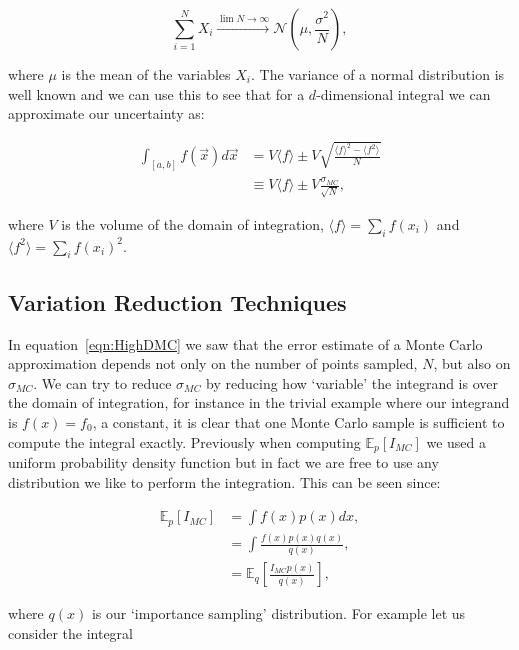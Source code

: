 	\begin{equation}
		\sum_{i=1}^{N}X_i\xrightarrow{\lim{N\rightarrow\infty}}\mathcal{N}\left(\mu, \frac{\sigma^2}{N}\right),
	\end{equation}

	\noindent where $\mu$ is the mean of the variables $X_i$.  The variance of a normal distribution is well known and we can use this to see that
	for a $d$-dimensional integral we can approximate our uncertainty as:

	\begin{align}
		\int_{[a, b]}f(\vec{x})d\vec{x} &= V\langle f\rangle \pm V\sqrt{\frac{\langle f\rangle^2 - \langle f^2\rangle}{N}}\\
		                                &\equiv V\langle f\rangle \pm V\frac{\sigma_{MC}}{\sqrt{N}},
		\label{eqn:HighDMC}
	\end{align}

	\noindent where $V$ is the volume of the domain of integration, $\langle f\rangle=\sum_i f(x_i)$ and $\langle f^2\rangle=\sum_i f(x_i)^2$.

	\subsection{Variation Reduction Techniques}
	\label{sub:VarReduction}

	In equation~\eqref{eqn:HighDMC} we saw that the error estimate of a Monte Carlo approximation depends not only on the number of points sampled,
	$N$, but also on $\sigma_{MC}$.  We can try to reduce $\sigma_{MC}$ by reducing how `variable' the integrand is over the domain of integration, for instance in the trivial
	example where our integrand is $f(x)=f_0$, a constant, it is clear that one Monte Carlo sample is sufficient to compute the integral exactly.
	Previously when computing $\mathbb{E}_p[I_{MC}]$ we used a uniform probability density function but in fact we are free to use any distribution we like
	to perform the integration.  This can be seen since:

	\begin{align*}
		\mathbb{E}_p[I_{MC}] &= \int f(x)p(x)dx, \\
		                     &= \int\frac{f(x)p(x)q(x)}{q(x)}, \\
		                     &= \mathbb{E}_q\left[\frac{I_{MC}p(x)}{q(x)}\right],
	\end{align*}

	\noindent where $q(x)$ is our `importance sampling' distribution.  For example let us consider the integral

